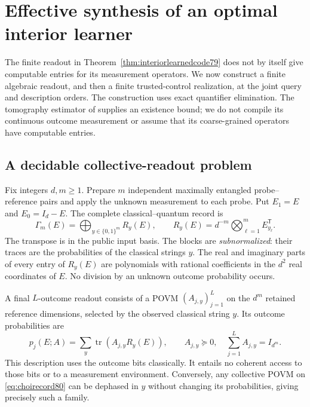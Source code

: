 \section{Effective synthesis of an optimal interior learner}
\label{sec:effectivelearning80}

The finite readout in Theorem~\ref{thm:interiorlearnedcode79} does not
by itself give computable entries for its measurement operators.
We now construct a finite algebraic readout, and then a finite
trusted-control realization, at the joint query and description
orders.  The construction uses exact quantifier elimination.  The
tomography estimator of \cite{MB67} supplies an existence bound;
we do not compile its continuous outcome measurement or assume
that its coarse-grained operators have computable entries.

\subsection{A decidable collective-readout problem}
Fix integers $d,m\ge1$.  Prepare $m$ independent maximally
entangled probe--reference pairs and apply the unknown measurement
to each probe.  Put $E_1=E$ and $E_0=I_d-E$.  The complete
classical--quantum record is
\begin{equation}\label{eq:choirecord80}
 \Gamma_m(E)=\bigoplus_{y\in\{0,1\}^m}R_y(E),\qquad
 R_y(E)=d^{-m}\bigotimes_{\ell=1}^m E_{y_\ell}^{\mathsf T}.
\end{equation}
The transpose is in the public input basis.  The blocks are
\emph{subnormalized}: their traces are the probabilities of the
classical strings $y$.  The real and imaginary parts of every entry
of $R_y(E)$ are polynomials with rational coefficients in the
$d^2$ real coordinates of $E$.  No division by an unknown outcome
probability occurs.

A final $L$-outcome readout consists of a POVM
$(A_{j,y})_{j=1}^L$ on the $d^m$ retained reference dimensions,
selected by the observed classical string $y$.  Its outcome
probabilities are
\begin{equation}\label{eq:readoutpolynomial80}
 p_j(E;A)=\sum_y\operatorname{tr}(A_{j,y}R_y(E)),\qquad
 A_{j,y}\succeq0,\quad\sum_{j=1}^L A_{j,y}=I_{d^m}.
\end{equation}
This description uses the outcome bits classically.  It entails no
coherent access to those bits or to a measurement environment.
Conversely, any collective POVM on \eqref{eq:choirecord80} can be
dephased in $y$ without changing its probabilities, giving precisely
such a family.

